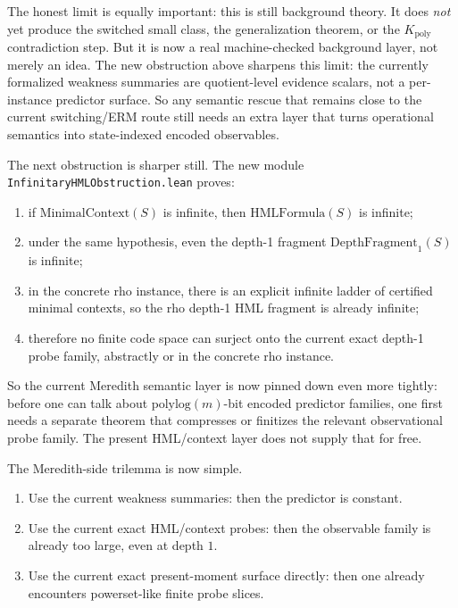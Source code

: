 \documentclass[11pt]{article}
\theoremstyle{remark}
\begin{document}
The honest limit is equally important: this is still background theory.  It does
\emph{not} yet produce the switched small class, the generalization theorem, or
the \(K_{\mathrm{poly}}\) contradiction step.  But it is now a real machine-checked
background layer, not merely an idea.
The new obstruction above sharpens this limit: the currently formalized
weakness summaries are quotient-level evidence scalars, not a per-instance
predictor surface.  So any semantic rescue that remains close to the
current switching/ERM route still needs an extra layer that turns operational
semantics into state-indexed encoded observables.

The next obstruction is sharper still.  The new module
\texttt{InfinitaryHMLObstruction.lean} proves:
\begin{enumerate}[leftmargin=1.5em]
  \item if \(\mathrm{MinimalContext}(S)\) is infinite, then \(\mathrm{HMLFormula}(S)\)
  is infinite;
  \item under the same hypothesis, even the depth-1 fragment
  \(\mathrm{DepthFragment}_1(S)\) is infinite;
  \item in the concrete rho instance, there is an explicit infinite ladder of
  certified minimal contexts, so the rho depth-1 HML fragment is already
  infinite;
  \item therefore no finite code space can surject onto the current exact
  depth-1 probe family, abstractly or in the concrete rho instance.
\end{enumerate}

So the current Meredith semantic layer is now pinned down even more tightly:
before one can talk about \(\mathrm{polylog}(m)\)-bit encoded predictor families,
one first needs a separate theorem that compresses or finitizes the relevant
observational probe family.  The present HML/context layer does not supply that
for free.

The Meredith-side trilemma is now simple.
\begin{enumerate}[leftmargin=1.5em]
  \item Use the current weakness summaries: then the predictor is constant.
  \item Use the current exact HML/context probes: then the observable family is
  already too large, even at depth \(1\).
  \item Use the current exact present-moment surface directly: then one already
  encounters powerset-like finite probe slices.
\end{enumerate}
\end{document}
